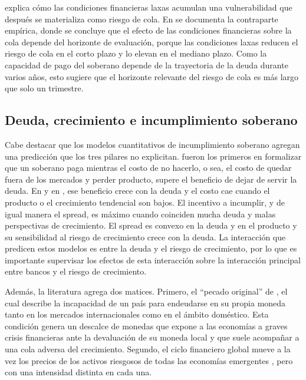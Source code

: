 \citet{Stein2012} explica cómo las condiciones financieras laxas acumulan una vulnerabilidad que después se materializa como riesgo de cola. En \citet{AdrianEtAl2022} se documenta la contraparte empírica, donde se concluye que el efecto de las condiciones financieras sobre la cola depende del horizonte de evaluación, porque las condiciones laxas reducen el riesgo de cola en el corto plazo y lo elevan en el mediano plazo. Como la capacidad de pago del soberano depende de la trayectoria de la deuda durante varios años, esto sugiere que el horizonte relevante del riesgo de cola es más largo que solo un trimestre.

\subsection{Deuda, crecimiento e incumplimiento soberano}
\label{sec:marco-incumplimiento}

Cabe destacar que los modelos cuantitativos de incumplimiento soberano agregan una predicción que los tres pilares no explicitan. \citet{EatonGersovitz1981} fueron los primeros en formalizar que un soberano paga mientras el costo de no hacerlo, o sea, el costo de quedar fuera de los mercados y perder producto, supere el beneficio de dejar de servir la deuda. En \citet{Arellano2008} y en \citet{AguiarGopinath2006}, ese beneficio crece con la deuda y el costo cae cuando el producto o el crecimiento tendencial son bajos. El incentivo a incumplir, y de igual manera el spread, es máximo cuando coinciden mucha deuda y malas perspectivas de crecimiento. El spread es convexo en la deuda y en el producto y su sensibilidad al riesgo de crecimiento crece con la deuda. La interacción que predicen estos modelos es entre la deuda y el riesgo de crecimiento, por lo que es importante supervisar los efectos de esta interacción sobre la interacción principal entre bancos y el riesgo de crecimiento.

Además, la literatura agrega dos matices. Primero, el ``pecado original'' de \citet{EichengreenHausmann1999}, el cual describe la incapacidad de un país para endeudarse en su propia moneda tanto en los mercados internacionales como en el ámbito doméstico. Esta condición genera un descalce de monedas que expone a las economías a graves crisis financieras ante la devaluación de su moneda local y que suele acompañar a una cola adversa del crecimiento. Segundo, el ciclo financiero global mueve a la vez los precios de los activos riesgosos de todas las economías emergentes \citep{Rey2013}, pero con una intensidad distinta en cada una.

